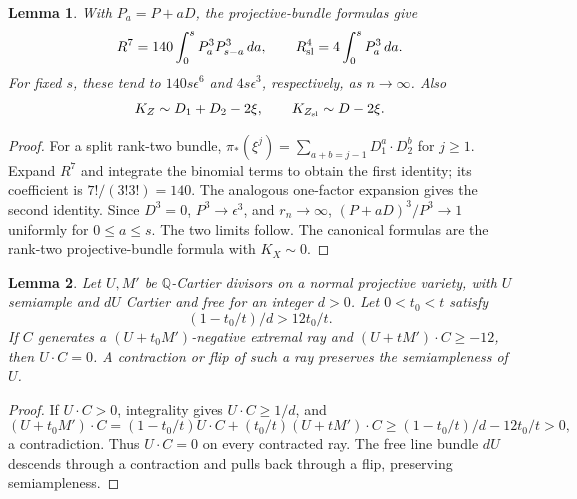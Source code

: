 \documentclass[12pt,a4paper,psamsfonts]{amsart}
\theoremstyle{definition}
\theoremstyle{plain}
\newtheorem{lemma}{Lemma}[section]
\begin{document}
\begin{lemma}\label{lem:bundle-volume}
With $P_a=P+aD$, the projective-bundle formulas give
\[
 R^7=140\int_0^s P_a^3P_{s-a}^3\,da,\qquad
 R_{\rm sl}^4=4\int_0^s P_a^3\,da.
\]
For fixed $s$, these tend to $140s\epsilon^6$ and
$4s\epsilon^3$, respectively, as $n\to\infty$. Also
\[
 K_Z\sim D_1+D_2-2\xi,\qquad K_{Z_{\rm sl}}\sim D-2\xi.
\]
\end{lemma}
\begin{proof}
For a split rank-two bundle,
$\pi_*(\xi^j)=\sum_{a+b=j-1}D_1^a\cdot D_2^b$ for $j\ge1$.
Expand $R^7$ and integrate the binomial terms to obtain the first
identity; its coefficient is $7!/(3!3!)=140$.
The analogous one-factor expansion gives the second identity.
Since $D^3=0$, $P^3\to\epsilon^3$, and $r_n\to\infty$,
$(P+aD)^3/P^3\to1$ uniformly for $0\le a\le s$.
The two limits follow. The canonical formulas are the rank-two
projective-bundle formula with $K_X\sim0$.
\end{proof}

\begin{lemma}\label{lem:semiample-trivial-rays}
Let $U,M'$ be $\mathbb{Q}$-Cartier divisors on a normal projective
variety, with $U$ semiample and $dU$ Cartier and free for an
integer $d>0$. Let $0<t_0<t$ satisfy
\[
 (1-t_0/t)/d>12t_0/t.
\]
If $C$ generates a $(U+t_0M')$-negative extremal ray and
$(U+tM')\cdot C\ge-12$, then $U\cdot C=0$. A contraction or flip of such
a ray preserves the semiampleness of $U$.
\end{lemma}
\begin{proof}
If $U\cdot C>0$, integrality gives $U\cdot C\ge1/d$, and
\[
 (U+t_0M')\cdot C=(1-t_0/t)U\cdot C+(t_0/t)(U+tM')\cdot C
 \ge(1-t_0/t)/d-12t_0/t>0,
\]
a contradiction. Thus $U\cdot C=0$ on every contracted ray.
The free line bundle $dU$ descends through a contraction and
pulls back through a flip, preserving semiampleness.
\end{proof}
\end{document}
